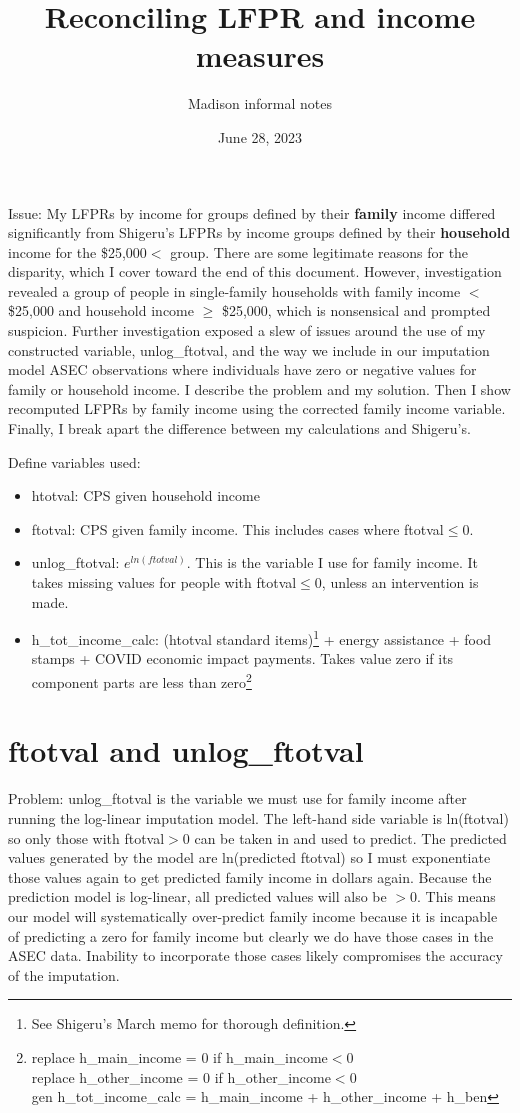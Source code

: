 \documentclass{article}
\title{Reconciling LFPR and income measures}
\author{Madison informal notes}
\date{June 28, 2023}
\begin{document}
 
	\maketitle
	
	Issue: My LFPRs by income for groups defined by their \textbf{family} income differed significantly from Shigeru's LFPRs by income  groups defined by their \textbf{household} income for the \$25,000$<$ group. There are some legitimate reasons for the disparity, which I cover toward the end of this document. However, investigation revealed a group of people in single-family households with family income $<$ \$25,000 and household income $\ge$ \$25,000, which is nonsensical and prompted suspicion. Further investigation exposed a slew of issues around the use of my constructed variable, unlog\_ftotval, and the way we include in our imputation model ASEC observations where individuals have zero or negative values for family or household income. I describe the problem and my solution. Then I show recomputed LFPRs by family income using the corrected family income variable. Finally, I break apart the difference between my calculations and Shigeru's. 
	
	Define variables used:
	\begin{itemize}
		\item htotval: CPS given household income
		\item ftotval: CPS given family income. This includes cases where ftotval$\le$0.
		\item unlog\_ftotval: $e^{ln(ftotval)}$. This is the variable I use for family income. It takes missing values for people with ftotval$\le$0, unless an intervention is made.
		\item h\_tot\_income\_calc:  (htotval standard items)\footnote{See Shigeru's March memo for thorough definition.} + energy assistance + food stamps + COVID economic impact payments. Takes value zero if its component parts are less than zero\footnote{replace h\_main\_income = 0  if  h\_main\_income$<$0 \\
			replace h\_other\_income = 0 if  h\_other\_income$<$0 \\ 
			gen h\_tot\_income\_calc = h\_main\_income +  h\_other\_income + h\_ben}
	\end{itemize}

	\section{ftotval and unlog\_ftotval}
	 Problem: unlog\_ftotval is the variable we must use for family income after running the log-linear imputation model. The left-hand side variable is ln(ftotval) so only those with ftotval$>$0 can be taken in and used to predict. The predicted values generated by the model are ln(predicted ftotval) so I must exponentiate those values again to get predicted family income in dollars again. Because the prediction model is log-linear, all predicted values will also be $>$0. This means our model will systematically over-predict family income because it is incapable of predicting a zero for family income but clearly we do have those cases in the ASEC data. Inability to incorporate those cases likely compromises the accuracy of the imputation. 
	 
\end{document}
